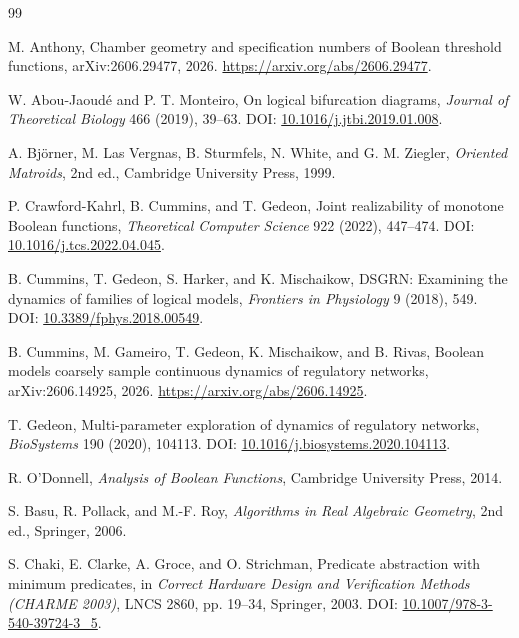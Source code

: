 \documentclass[11pt]{article}
\theoremstyle{definition}
\theoremstyle{remark}
\begin{document}
\begin{thebibliography}{99}

M. Anthony,
\newblock Chamber geometry and specification numbers of Boolean threshold functions,
\newblock arXiv:2606.29477, 2026.
\newblock \url{https://arxiv.org/abs/2606.29477}.


W. Abou-Jaoud\'e and P. T. Monteiro,
\newblock On logical bifurcation diagrams,
\newblock \emph{Journal of Theoretical Biology} 466 (2019), 39--63.
\newblock DOI: \href{https://doi.org/10.1016/j.jtbi.2019.01.008}{10.1016/j.jtbi.2019.01.008}.

A. Bj\"orner, M. Las Vergnas, B. Sturmfels, N. White, and G. M. Ziegler,
\newblock \emph{Oriented Matroids}, 2nd ed.,
\newblock Cambridge University Press, 1999.

P. Crawford-Kahrl, B. Cummins, and T. Gedeon,
\newblock Joint realizability of monotone Boolean functions,
\newblock \emph{Theoretical Computer Science} 922 (2022), 447--474.
\newblock DOI: \href{https://doi.org/10.1016/j.tcs.2022.04.045}{10.1016/j.tcs.2022.04.045}.

B. Cummins, T. Gedeon, S. Harker, and K. Mischaikow,
\newblock DSGRN: Examining the dynamics of families of logical models,
\newblock \emph{Frontiers in Physiology} 9 (2018), 549.
\newblock DOI: \href{https://doi.org/10.3389/fphys.2018.00549}{10.3389/fphys.2018.00549}.

B. Cummins, M. Gameiro, T. Gedeon, K. Mischaikow, and B. Rivas,
\newblock Boolean models coarsely sample continuous dynamics of regulatory networks,
\newblock arXiv:2606.14925, 2026.
\newblock \url{https://arxiv.org/abs/2606.14925}.

T. Gedeon,
\newblock Multi-parameter exploration of dynamics of regulatory networks,
\newblock \emph{BioSystems} 190 (2020), 104113.
\newblock DOI: \href{https://doi.org/10.1016/j.biosystems.2020.104113}{10.1016/j.biosystems.2020.104113}.

R. O'Donnell,
\newblock \emph{Analysis of Boolean Functions},
\newblock Cambridge University Press, 2014.

S. Basu, R. Pollack, and M.-F. Roy,
\newblock \emph{Algorithms in Real Algebraic Geometry}, 2nd ed.,
\newblock Springer, 2006.

S. Chaki, E. Clarke, A. Groce, and O. Strichman,
\newblock Predicate abstraction with minimum predicates,
\newblock in \emph{Correct Hardware Design and Verification Methods (CHARME 2003)}, LNCS 2860, pp. 19--34, Springer, 2003.
\newblock DOI: \href{https://doi.org/10.1007/978-3-540-39724-3_5}{10.1007/978-3-540-39724-3\_5}.


\end{thebibliography}
\end{document}
